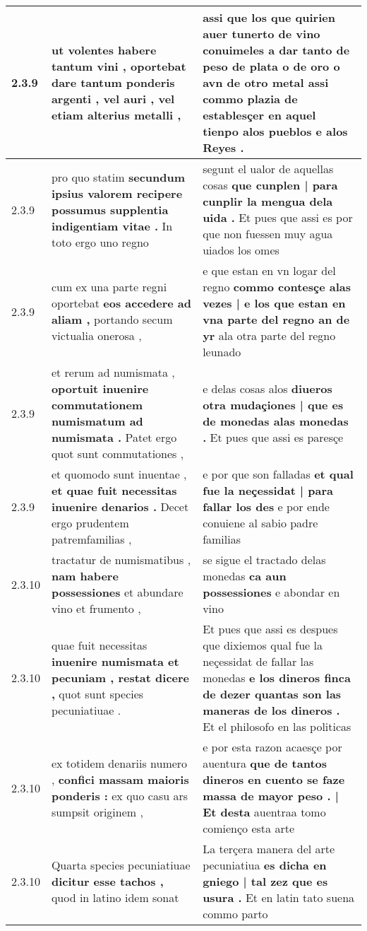 \begin{tabular}{|p{1cm}|p{6.5cm}|p{6.5cm}|}
2.3.9 & ut volentes habere tantum vini , \textbf{ oportebat dare tantum ponderis argenti , vel auri , } vel etiam alterius metalli , & assi que los que quirien auer tunerto de vino \textbf{ conuimeles a dar tanto de peso de plata o de oro o avn de otro metal } assi commo plazia de establesçer en aquel tienpo alos pueblos e alos Reyes . \\\hline
2.3.9 & pro quo statim \textbf{ secundum ipsius valorem recipere possumus supplentia indigentiam vitae . } In toto ergo uno regno & segunt el ualor de aquellas cosas \textbf{ que cunplen | para cunplir la mengua dela uida . } Et pues que assi es por que non fuessen muy agua uiados los omes \\\hline
2.3.9 & cum ex una parte regni oportebat \textbf{ eos accedere ad aliam , } portando secum victualia onerosa , & e que estan en vn logar del regno \textbf{ commo contesçe alas vezes | e los que estan en vna parte del regno an de yr } ala otra parte del regno leunado \\\hline
2.3.9 & et rerum ad numismata , \textbf{ oportuit inuenire commutationem numismatum ad numismata . } Patet ergo quot sunt commutationes , & e delas cosas alos \textbf{ diueros otra mudaçiones | que es de monedas alas monedas . } Et pues que assi es paresçe \\\hline
2.3.9 & et quomodo sunt inuentae , \textbf{ et quae fuit necessitas inuenire denarios . } Decet ergo prudentem patremfamilias , & e por que son falladas \textbf{ et qual fue la neçessidat | para fallar los des } e por ende conuiene al sabio padre familias \\\hline
2.3.10 & tractatur de numismatibus , \textbf{ nam habere possessiones } et abundare vino et frumento , & se sigue el tractado delas monedas \textbf{ ca aun possessiones } e abondar en vino \\\hline
2.3.10 & quae fuit necessitas \textbf{ inuenire numismata et pecuniam , restat dicere , } quot sunt species pecuniatiuae . & Et pues que assi es despues que dixiemos qual fue la neçessidat de fallar las monedas \textbf{ e los dineros finca de dezer quantas son las maneras de los dineros . } Et el philosofo en las politicas \\\hline
2.3.10 & ex totidem denariis numero , \textbf{ confici massam maioris ponderis : } ex quo casu ars sumpsit originem , & e por esta razon acaesçe por auentura \textbf{ que de tantos dineros en cuento se faze massa de mayor peso . | Et desta } auentraa tomo comienço esta arte \\\hline
2.3.10 & Quarta species pecuniatiuae \textbf{ dicitur esse tachos , } quod in latino idem sonat & La terçera manera del arte pecuniatiua \textbf{ es dicha en gniego | tal zez que es usura . } Et en latin tato suena commo parto \\\hline

\end{tabular}
